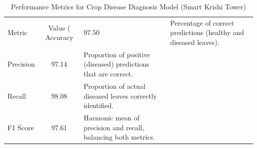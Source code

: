 \begin{table}
\caption{Performance Metrics for Crop Disease Diagnosis Model (Smart Krishi Tower)}
\label{tab:metrics}
\begin{tabular}{l|c|p{8cm}}
\toprule
Metric & Value (%
\midrule
Accuracy & 97.50 & Percentage of correct predictions (healthy and diseased leaves). \\
Precision & 97.14 & Proportion of positive (diseased) predictions that are correct. \\
Recall & 98.08 & Proportion of actual diseased leaves correctly identified. \\
F1 Score & 97.61 & Harmonic mean of precision and recall, balancing both metrics. \\
\bottomrule
\end{tabular}
\end{table}

